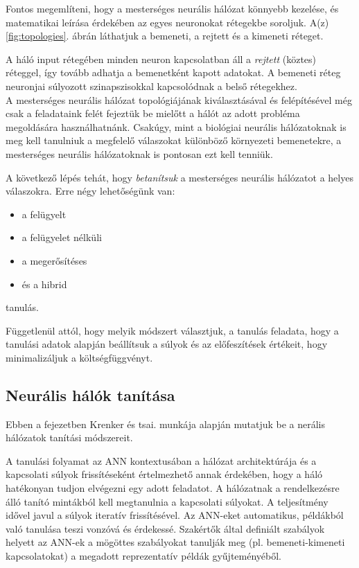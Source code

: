 \documentclass[12pt,a4]{article}
\begin{document}
	Fontos megemlíteni, hogy a mesterséges neurális hálózat könnyebb kezelése, és matematikai leírása érdekében az egyes neuronokat rétegekbe soroljuk. A(z) \ref{fig:topologies}. ábrán láthatjuk a bemeneti, a rejtett és a kimeneti réteget.
	
	A háló input rétegében minden neuron kapcsolatban áll a \textit{rejtett} (köztes) réteggel, így tovább adhatja a bemenetként kapott adatokat. A bemeneti réteg neuronjai súlyozott szinapszisokkal kapcsolódnak a belső rétegekhez.\\
	
	A mesterséges neurális hálózat 
	topológiájának kiválasztásával és 
	felépítésével még csak a feladataink 
	felét fejeztük be mielőtt a hálót az 
	adott probléma megoldására használhatnánk.
	Csakúgy, mint a biológiai neurális hálózatoknak
	is meg kell tanulniuk a megfelelő válaszokat különböző környezeti bemenetekre, a mesterséges neurális hálózatoknak is pontosan ezt kell tenniük.
	
	A következő lépés tehát, hogy \textit{betanítsuk} a mesterséges neurális hálózatot a helyes válaszokra.
	Erre négy lehetőségünk van:
	\begin{itemize}
		\item a felügyelt
		\item a felügyelet nélküli
		\item a megerősítéses
		\item és a hibrid
	\end{itemize}
	tanulás.
	
	 Függetlenül attól, hogy melyik módszert választjuk, a tanulás feladata, hogy a tanulási adatok alapján beállítsuk a súlyok és az előfeszítések értékeit, hogy minimalizáljuk a 
	költségfüggvényt.
	
	\subsection{Neurális hálók tanítása}
    Ebben a fejezetben Krenker és tsai. \cite{krenker} munkája alapján mutatjuk be a nerális hálózatok tanítási módszereit.
 
	A tanulási folyamat az ANN \cite{ann2} kontextusában a
	hálózat architektúrája és a kapcsolati súlyok frissítéseként értelmezhető annak érdekében, hogy a háló hatékonyan tudjon elvégezni egy adott feladatot.
	A hálózatnak a rendelkezésre álló tanító mintákból kell megtanulnia a kapcsolati súlyokat. A teljesítmény idővel javul a súlyok iteratív frissítésével.
	Az ANN-eket automatikus, példákból való tanulása teszi 
	vonzóvá és érdekessé. Szakértők által definiált szabályok helyett az ANN-ek a mögöttes szabályokat tanulják meg (pl. bemeneti-kimeneti kapcsolatokat) a megadott reprezentatív példák gyűjteményéből.
	
\end{document}
